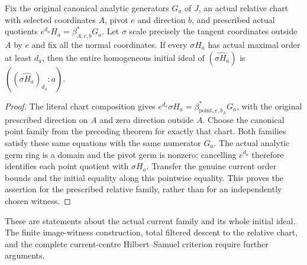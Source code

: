 \begin{theorem}
\label{hir:actual-relative-point-same-family-current-initial-generation}
\leanok
Fix the original canonical analytic generators $G_a$ of $J$, an actual
relative chart with selected coordinates $A$, pivot $e$ and direction $b$,
and prescribed actual quotients $e^{d_a}H_a=\beta_{A,e,b}^*G_a$.
Let $\sigma$ scale precisely the tangent coordinates outside $A$ by $e$
and fix all the normal coordinates. If every $\sigma H_a$ has actual
maximal order at least $d_a$, then the entire homogeneous initial ideal of
$(\widehat{\sigma H_a})$ is
$((\widehat{\sigma H_a})_{d_a}:a)$.
\end{theorem}
\begin{proof}
The literal chart composition gives
$e^{d_a}\sigma H_a=\beta_{\mathrm{point},e,b_A}^*G_a$, with the original
prescribed direction on $A$ and zero direction outside $A$. Choose the
canonical point family from the preceding theorem for exactly that chart.
Both families satisfy these same equations with the same numerator $G_a$.
The actual analytic germ ring is a domain and the pivot germ is nonzero;
cancelling $e^{d_a}$ therefore identifies each point quotient with
$\sigma H_a$. Transfer the genuine current order bounds and the initial
equality along this pointwise equality. This proves the assertion for the
prescribed relative family, rather than for an independently chosen witness.
\end{proof}

These are statements about the actual current family and its whole initial
ideal. The finite image-witness construction, total filtered descent to the
relative chart, and the complete current-centre Hilbert--Samuel criterion
require further arguments.
